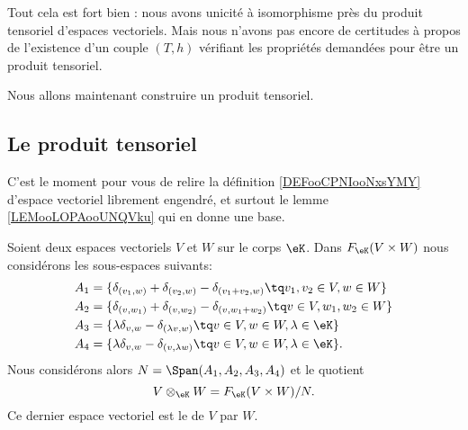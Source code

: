 Tout cela est fort bien : nous avons unicité à isomorphisme près du produit tensoriel d'espaces vectoriels. Mais nous n'avons pas encore de certitudes à propos de l'existence d'un couple \( (T,h)\) vérifiant les propriétés demandées pour être un produit tensoriel.

Nous allons maintenant construire un produit tensoriel.

\subsection{Le produit tensoriel}

C'est le moment pour vous de relire la définition \ref{DEFooCPNIooNxsYMY} d'espace vectoriel librement engendré, et surtout le lemme \ref{LEMooLOPAooUNQVku} qui en donne une base.

\begin{definition}       \label{DEFooKTVDooSPzAhH}
    Soient deux espaces vectoriels \( V\) et \( W\) sur le corps \( \eK\). Dans \( F_{\eK}(V\times W)\) nous considérons les sous-espaces suivants:
    \begin{subequations}
        \begin{align}
            A_1&=\{ \delta_{(v_1,w)}+\delta_{(v_2,w)}-\delta_{(v_1+v_2,w)}\tq v_1,v_2\in V,w\in W  \}\\
            A_2&=\{ \delta_{(v,w_1)}+\delta_{(v,w_2)}-\delta_{(v,w_1+w_2)}\tq v\in V,w_1,w_2\in W  \}\\
            A_3&=\{ \lambda\delta_{v,w}-\delta_{(\lambda v, w)}\tq v\in V,w\in W,\lambda\in \eK \}\\
            A_4&=\{ \lambda\delta_{v,w}-\delta_{(v,\lambda w)}\tq v\in V,w\in W,\lambda\in \eK \}.
        \end{align}
    \end{subequations}
    Nous considérons alors \( N=\Span(A_1,A_2,A_3,A_4)\) et le quotient
    \begin{equation}
        V\otimes_{\eK}W=F_{\eK}(V\times W)/N.
    \end{equation}
    Ce dernier espace vectoriel est le  de \( V\) par \( W\).
\end{definition}

